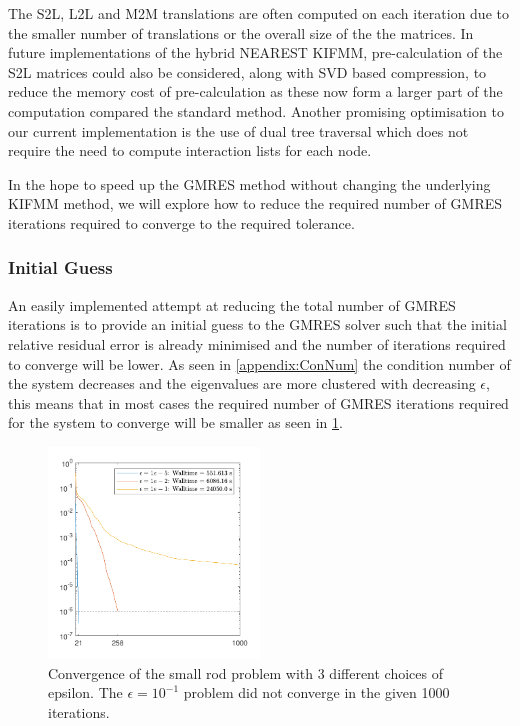 The S2L, L2L and M2M translations are often computed on each iteration due to the smaller number of translations or the overall size of the the matrices. In future implementations of the hybrid NEAREST KIFMM, pre-calculation of the S2L matrices could also be considered, along with SVD based compression, to reduce the memory cost of pre-calculation \cite{Drineas2006FAST,Cao2012ABEM} as these now form a larger part of the computation compared the standard method. Another promising optimisation to our current implementation is the use of dual tree traversal \cite{Yokota2013AnArchitectures:,Dehnen2002AAlgorithm,Carrier2006ASimulations,Wilson2021ATraversal} which does not require the need to compute interaction lists for each node.

In the hope to speed up the GMRES method without changing the underlying KIFMM method, we will explore how to reduce the required number of GMRES iterations required to converge to the required tolerance.

\subsubsection{Initial Guess}\label{sec:Guess}

An easily implemented attempt at reducing the total number of GMRES iterations is to provide an initial guess to the GMRES solver such that the initial relative residual error is already minimised and the number of iterations required to converge will be lower. As seen in \cref{appendix:ConNum} the condition number of the system decreases and the eigenvalues are more clustered with decreasing $\epsilon$, this means that in most cases the required number of GMRES iterations required for the system to converge will be smaller as seen in \cref{fig:InitalGuessEPS}.

\begin{figure}[ht]
    \centering
    \includegraphics[width=0.5\textwidth]{Images/InitalGuessEPS.pdf}
    \caption{Convergence of the small rod problem with 3 different choices of epsilon. The $\epsilon = 10^{-1}$ problem did not converge in the given 1000 iterations.}
    \label{fig:InitalGuessEPS}
\end{figure}

